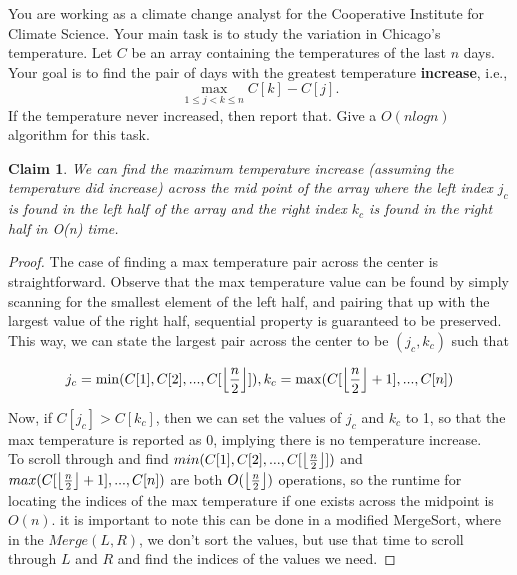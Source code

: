 \documentclass[11pt]{article}
\DeclarePairedDelimiter\floor{\lfloor}{\rfloor}
\newtheorem{claim}[theorem]{Claim}
\begin{document}
You are working as a climate change analyst for the Cooperative Institute for Climate Science. Your main task is to study the variation in Chicago's temperature. Let $C$ be an array containing the temperatures of the last $n$ days. Your goal is to find the pair of days with the greatest temperature  \textbf{increase}, i.e.,
\begin{equation}
	\max\limits_{1 \leq j < k \leq n} C[k] - C[j].
\end{equation}
If the temperature never increased, then report that. Give a $O(nlogn)$ algorithm for this task.
\begin{claim}
We can find the maximum temperature increase (assuming the temperature did increase) across the mid point of the array where the left index $j_c$ is found in the left half of the array and the right index $k_c$ is found in the right half in O(n) time.
\end{claim}
\begin{proof}
The case of finding a max temperature pair across the center is straightforward. Observe that the max temperature value can be found by simply scanning for the smallest element of the left half, and pairing that up with the largest value of the right half, sequential property is guaranteed to be preserved. This way, we can state the largest pair across the center to be $(j_c, k_c)$ such that 

\begin{equation}
	j_c = \min(C[1], C[2], ... , C[\floor*{\frac{n}{2}}]),  k_c = \max(C[\floor*{\frac{n}{2}}+1], ... , C[n])
\end{equation}

Now, if $C[j_c] > C[k_c]$, then we can set the values of $j_c$ and $k_c$ to 1, so that the max temperature is reported as $0$, implying there is no temperature increase.\\

To scroll through and find $min(C[1], C[2], ... , C[\floor*{\frac{n}{2}}])$ and $max(C[\floor*{\frac{n}{2}}+1], ... , C[n])$ are both $O(\floor*{\frac{n}{2}})$ operations, so the runtime for locating the indices of the max temperature if one exists across the midpoint is $O(n)$. it is important to note this can be done in a modified MergeSort, where in the $Merge(L,R)$, we don't sort the values, but use that time to scroll through $L$ and $R$ and find the indices of the values we need.
\end{proof}
\end{document}
